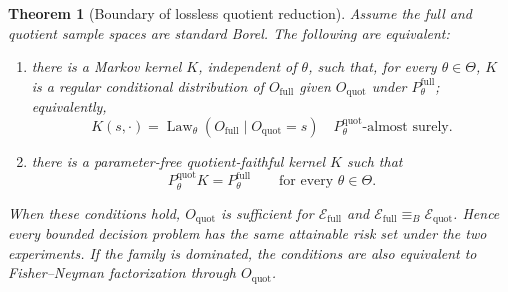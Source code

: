 \documentclass[11pt]{article}
\theoremstyle{plain}
\newtheorem{theorem}{Theorem}[section]
\theoremstyle{definition}
\numberwithin{equation}{section}
\DeclareMathOperator{\Law}{Law}
\newcommand{\1}{\mathbf 1}
\newcommand{\calE}{\mathcal E}
\newcommand{\full}{\mathrm{full}}
\newcommand{\quot}{\mathrm{quot}}
\begin{document}
\begin{theorem}[Boundary of lossless quotient reduction]\label{thm:boundary}
Assume the full and quotient sample spaces are standard Borel. The following are equivalent:
\begin{enumerate}
\item there is a Markov kernel $K$, independent of $\theta$, such that,
for every $\theta\in\Theta$, $K$ is a regular conditional
distribution of $O_{\full}$ given $O_{\quot}$ under
$P_\theta^{\full}$; equivalently,
\[
K(s,\cdot)
=
\Law_\theta(O_{\full}\mid O_{\quot}=s)
\quad
P_\theta^{\quot}\text{-almost surely}.
\]
\item there is a parameter-free quotient-faithful kernel $K$ such that
\begin{equation}\label{eq:reverse-kernel}
P_\theta^{\quot}K=P_\theta^{\full}\qquad\text{for every }\theta\in\Theta.
\end{equation}
\end{enumerate}
When these conditions hold, $O_{\quot}$ is sufficient for $\calE_{\full}$ and $\calE_{\full}\equiv_B\calE_{\quot}$. Hence every bounded decision problem has the same attainable risk set under the two experiments. If the family is dominated, the conditions are also equivalent to Fisher--Neyman factorization through $O_{\quot}$.
\end{theorem}
\end{document}
